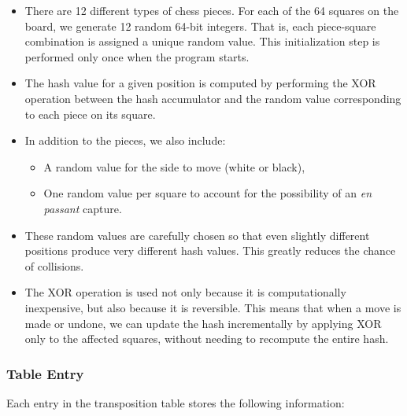 \begin{itemize}
  \item There are 12 different types of chess pieces. For each of the 64 squares on the board, we generate 12 random 64-bit integers. That is, each piece-square combination is assigned a unique random value. This initialization step is performed only once when the program starts.
  
  \item The hash value for a given position is computed by performing the XOR operation between the hash accumulator and the random value corresponding to each piece on its square.
  
  \item In addition to the pieces, we also include:
  \begin{itemize}
    \item A random value for the side to move (white or black),
    \item One random value per square to account for the possibility of an \textit{en passant} capture.
  \end{itemize}
  
  \item These random values are carefully chosen so that even slightly different positions produce very different hash values. This greatly reduces the chance of collisions.
  
  \item The XOR operation is used not only because it is computationally inexpensive, but also because it is reversible. This means that when a move is made or undone, we can update the hash incrementally by applying XOR only to the affected squares, without needing to recompute the entire hash.
\end{itemize}

\subsubsection{Table Entry}

Each entry in the transposition table stores the following information:

